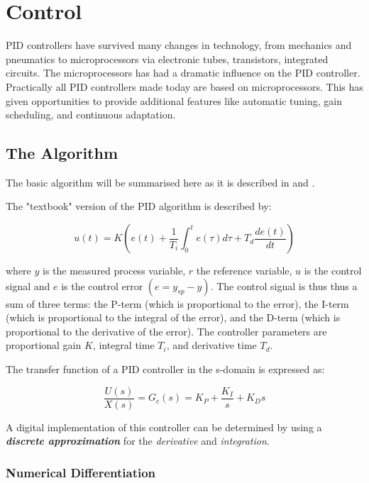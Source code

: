 
\section{Control}

PID controllers have survived many changes in technology, from mechanics and pneumatics to microprocessors via electronic tubes, transistors, integrated circuits. The microprocessors has had a dramatic influence on the PID controller. Practically all PID controllers made today are based on microprocessors. This has given opportunities to provide additional features like automatic tuning, gain scheduling, and continuous adaptation.

\subsection{The Algorithm}

The basic algorithm will be summarised here as it is described in \cite{Dorf} and \cite{Astrom}.

The "textbook" version of the PID algorithm is described by:

\begin{equation}
	u(t) = K \left(e(t) + \frac{1}{T_i} \int_{0}^{t} e(\tau) d\tau + T_d \frac{d e(t)}{dt} \right)
	\label{Eq:pid_simple}
\end{equation}

\noindent where $y$ is the measured process variable, $r$ the reference variable, $u$ is the control signal and $e$ is the control error $(e = y_{sp}-y)$. The control signal is thus thus a sum of three terms: the P-term (which is proportional to the error), the I-term (which is proportional to the integral of the error), and the D-term (which is proportional to the derivative of the error). The controller parameters are proportional gain $K$, integral time $T_i$, and derivative time $T_d$.

The transfer function of a PID controller in the s-domain is expressed as:

\begin{equation}
	\frac{U(s)}{X(s)} = G_c(s) = K_P + \frac{K_I}{s} + K_D s
	\label{Eq:pid_s-domain}
\end{equation}

A digital implementation of this controller can be determined by using a \textit{\textbf{discrete approximation}} for the \textit{derivative} and \textit{integration}.

\subsubsection{Numerical Differentiation}

